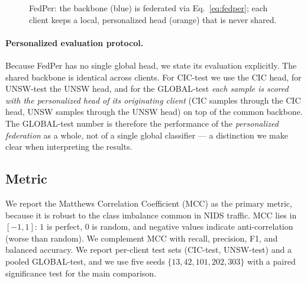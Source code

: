 \documentclass[11pt,a4paper]{article}
\begin{document}
\begin{figure}[htbp]
\centering
{}
\caption{FedPer: the backbone (blue) is federated via Eq.~\ref{eq:fedper}; each
client keeps a local, personalized head (orange) that is never shared.}
\label{fig:fedper}
\end{figure}

\paragraph{Personalized evaluation protocol.} Because FedPer has no single global
head, we state its evaluation explicitly. The shared backbone is identical across
clients. For CIC-test we use the CIC head, for UNSW-test the UNSW head, and for the
GLOBAL-test \emph{each sample is scored with the personalized head of its
originating client} (CIC samples through the CIC head, UNSW samples through the
UNSW head) on top of the common backbone. The GLOBAL-test number is therefore the
performance of the \emph{personalized federation} as a whole, not of a single
global classifier --- a distinction we make clear when interpreting the results.

\subsection{Metric}
We report the Matthews Correlation Coefficient (MCC) \cite{matthews} as the
primary metric,
because it is robust to the class imbalance common in NIDS traffic. MCC lies in
\([-1,1]\): \(1\) is perfect, \(0\) is random, and negative values indicate
anti-correlation (worse than random). We complement MCC with recall, precision,
F1, and balanced accuracy. We report per-client test sets (CIC-test, UNSW-test)
and a pooled GLOBAL-test, and we use five seeds \(\{13,42,101,202,303\}\) with a
paired significance test for the main comparison.
\end{document}
